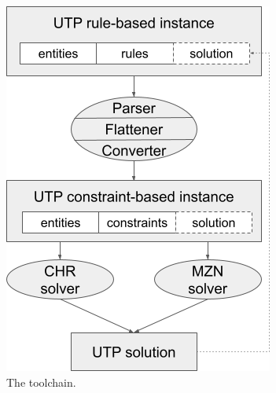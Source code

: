 
\begin{figure}
    \centering
    \includegraphics[scale=0.4]{img/utp_toolchain.png}
    \caption{The \UTP{} toolchain.}
    \label{fig:toolchain}
\end{figure}

